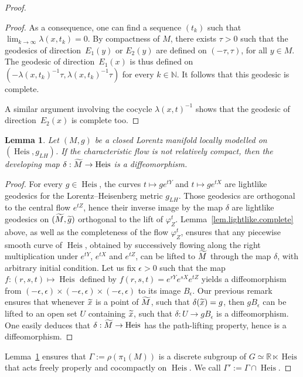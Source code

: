 \documentclass[11pt]{article}
\newtheorem{lemm}[theo]{Lemma}
\theoremstyle{definition}
\numberwithin{equation}{section}
\numberwithin{figure}{section}
\numberwithin{table}{section}
\DeclareMathOperator{\Heis}{Heis}
\newcommand*\NN{\mathbb{N}}
\newcommand*\RR{\mathbb{R}}
\let\oldtilde\tilde
\renewcommand*\tilde[1]{\mathchoice{\widetilde{#1}}{\widetilde{#1}}{\widetilde{#1}}{\oldtilde{#1}}}
\begin{document}
\begin{proof}
\begin{proof}
As a consequence, one can find a sequence $(t_k)$ such that $\lim_{k \to \infty}\lambda(x,t_k)=0$. By compactness of $M$, there exists $\tau>0$ such that the geodesics of direction~$E_1(y)$ or $E_2(y)$ are defined on $(-\tau, \tau)$, for all $y \in M$. The geodesic of direction~$E_1(x)$ is thus defined on $(-\lambda(x,t_k)^{-1} \tau, \lambda(x,t_k)^{-1} \tau)$ for every $k \in \NN$. It follows that this geodesic is complete.

A similar argument involving the cocycle $\lambda(x,t)^{-1}$ shows that the geodesic of direction~$E_2(x)$ is complete too.
\end{proof}


\begin{lemm}\label{lem.dev}
Let $(M,g)$ be a closed Lorentz manifold locally modelled on $(\Heis,g_{LH})$. If the characteristic flow is not relatively compact, then the developing map $\delta: \tilde{M} \to \Heis$ is a diffeomorphism.
\end{lemm}

\begin{proof}
For every $g \in \Heis$, the curves $t \mapsto g e^{tY}$ and $t \mapsto g e^{tX}$ are lightlike geodesics for the Lorentz--Heisenberg metric $g_{LH}$. Those geodesics are orthogonal to the central flow $e^{tZ}$, hence their inverse image by the map $\delta$ are lightlike geodesics on $(\tilde{M},\tilde{g})$ orthogonal to the lift of $\varphi_Z^t$. Lemma~\ref{lem.lightlike.complete} above, as well as the completeness of the flow $\varphi_Z^t$, ensures that any piecewise smooth curve of $\Heis$, obtained by successively flowing along the right multiplication under $e^{tY}$, $e^{tX}$ and $e^{tZ}$, can be lifted to $\tilde{M}$ through the map $\delta$, with arbitrary initial condition. Let us fix $\epsilon >0$ such that the map $f:(r,s,t) \mapsto \Heis$ defined by $f(r,s,t)=e^{rY}e^{sX}e^{tZ}$ yields a diffeomorphism from $(-\epsilon, \epsilon) \times (-\epsilon, \epsilon) \times (-\epsilon, \epsilon)$ to its image $B_{\epsilon}$. Our previous remark ensures that whenever $\tilde{x}$ is a point of $\tilde{M}$, such that $\delta(\tilde{x})=g$, then $gB_{\epsilon}$ can be lifted to an open set $U$ containing $\tilde{x}$, such that $\delta: U \to gB_{\epsilon}$ is a diffeomorphism. One easily deduces that $\delta: \tilde{M} \to \Heis$ has the path-lifting property, hence is a diffeomorphism.
\end{proof}

Lemma~\ref{lem.dev} ensures that $\Gamma:=\rho(\pi_1(M))$ is a discrete subgroup of $G \simeq \RR \ltimes \Heis$ that acts freely properly and cocompactly on $\Heis$. We call $\Gamma':=\Gamma \cap \Heis$.


\end{proof}
\end{document}
